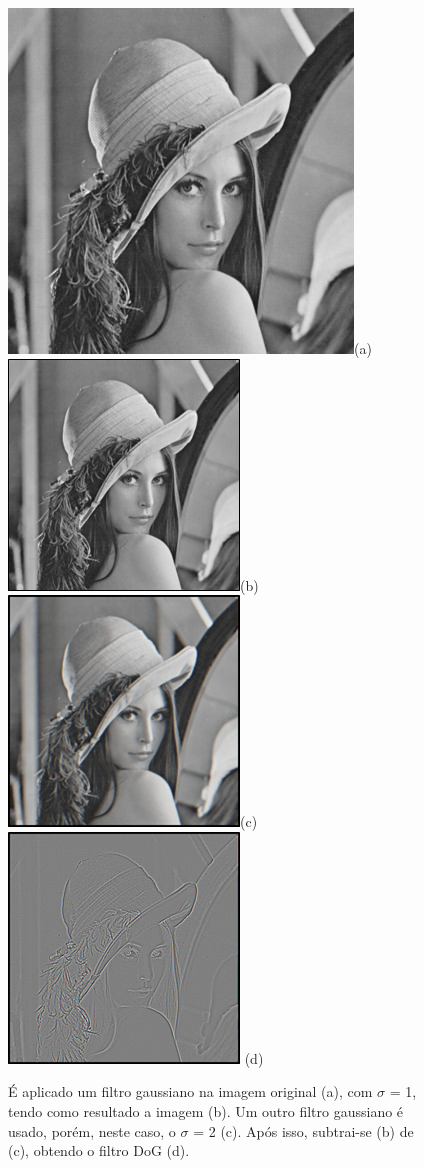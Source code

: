 \begin{figure} [!h]
	\centering
	\includegraphics[width=0.45\linewidth]{figs/lena.jpg}(a)
	\includegraphics[width=0.45\linewidth]{figs/lenaSigma1.png}(b)
	\includegraphics[width=0.45\linewidth]{figs/lenaSigma2.png}(c)
 	\includegraphics[width=0.45\linewidth]{figs/lenaDoG.png} (d)
	\caption{%
	É aplicado um filtro gaussiano na imagem original (a), com $\sigma$ = 1, tendo como resultado a imagem (b).
	Um outro filtro gaussiano é usado, porém, neste caso, o $\sigma$ = 2 (c). Após isso, subtrai-se (b) de (c), obtendo 
	o filtro DoG (d).
	}\label{fig:lenadog}
\end{figure}

